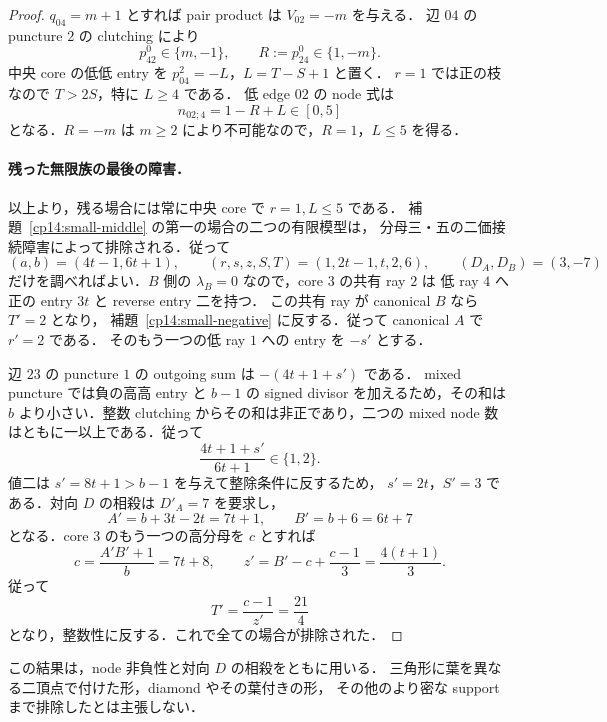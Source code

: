 \begin{proof}
$q_{04}=m+1$ とすれば pair product は $V_{02}=-m$ を与える．
辺 $04$ の puncture $2$ の clutching により
\[
 p^0_{42}\in\{m,-1\},\qquad R:=p^0_{24}\in\{1,-m\}.
\]
中央 core の低低 entry を $p^2_{04}=-L$，$L=T-S+1$ と置く．
$r=1$ では正の枝なので $T>2S$，特に $L\geq4$ である．
低 edge $02$ の node 式は
\begin{equation}\label{cp14:central-low-node}
 n_{02;4}=1-R+L\in[0,5]
\end{equation}
となる．$R=-m$ は $m\geq2$ により不可能なので，$R=1$，$L\leq5$ を得る．

\paragraph{残った無限族の最後の障害．}
以上より，残る場合には常に中央 core で $r=1,L\leq5$ である．
補題~\ref{cp14:small-middle} の第一の場合の二つの有限模型は，
分母三・五の二価接続障害によって排除される．従って
\[
 (a,b)=(4t-1,6t+1),\qquad
 (r,s,z,S,T)=(1,2t-1,t,2,6),\qquad (D_A,D_B)=(3,-7)
\]
だけを調べればよい．$B$ 側の $\lambda_B=0$ なので，core $3$ の共有 ray $2$ は
低 ray $4$ へ正の entry $3t$ と reverse entry 二を持つ．
この共有 ray が canonical $B$ なら $T'=2$ となり，
補題~\ref{cp14:small-negative} に反する．従って canonical $A$ で $r'=2$ である．
そのもう一つの低 ray $1$ への entry を $-s'$ とする．

辺 $23$ の puncture $1$ の outgoing sum は $-(4t+1+s')$ である．
mixed puncture では負の高高 entry と $b-1$ の signed divisor を加えるため，その和は $b$ より小さい．整数 clutching からその和は非正であり，二つの mixed node 数はともに一以上である．従って
\[
 \frac{4t+1+s'}{6t+1}\in\{1,2\}.
\]
値二は $s'=8t+1>b-1$ を与えて整除条件に反するため，
$s'=2t$，$S'=3$ である．対向 $D$ の相殺は $D'_A=7$ を要求し，
\[
 A'=b+3t-2t=7t+1,\qquad B'=b+6=6t+7
\]
となる．core $3$ のもう一つの高分母を $c$ とすれば
\[
 c=\frac{A'B'+1}{b}=7t+8,
 \qquad z'=B'-c+\frac{c-1}{3}=\frac{4(t+1)}3.
\]
従って
\[
 T'=\frac{c-1}{z'}=\frac{21}{4}
\]
となり，整数性に反する．これで全ての場合が排除された．
\end{proof}

この結果は，node 非負性と対向 $D$ の相殺をともに用いる．
三角形に葉を異なる二頂点で付けた形，diamond やその葉付きの形，
その他のより密な support まで排除したとは主張しない．
